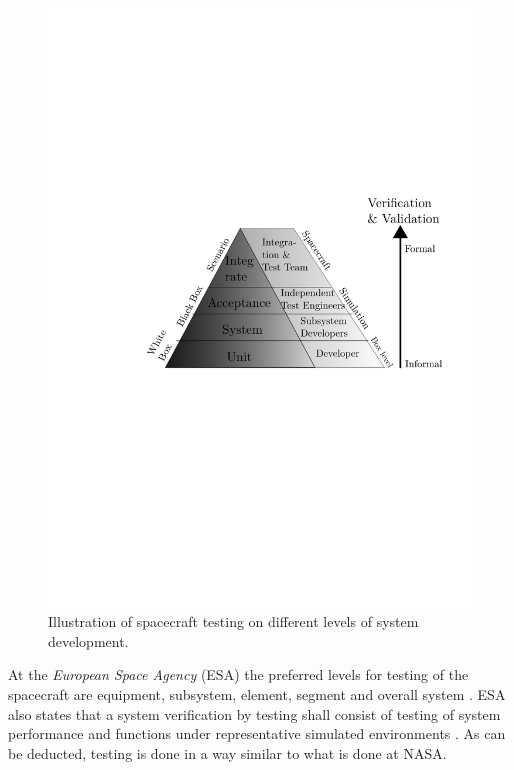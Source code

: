 \documentclass[english,12pt,a4paper,pdftex,elec,utf8]{aaltothesis}
\begin{document}
\begin{figure}[h!]
\centering
\includegraphics[scale=0.8]{spacetestingnew}
\caption{Illustration of spacecraft testing on different levels of system development. \cite{softacceptancespace, tor}}
\label{testlevelchart}
\end{figure}
At the \textit{European Space Agency} (ESA) the preferred levels for testing of the spacecraft are equipment, subsystem, element, segment and overall system \cite{ecss}. ESA also states that a system verification by testing shall consist of testing of system performance and functions under representative simulated environments \cite{ecss}. As can be deducted, testing is done in a way similar to what is done at NASA. \par 
\end{document}
